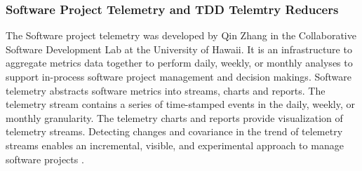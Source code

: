 \subsubsection{Software Project Telemetry and TDD Telemtry Reducers}
The Software project telemetry \cite{csdl2-04-11,csdl2-06-05} was 
developed by Qin Zhang in the Collaborative Software Development 
Lab at the University of Hawaii. It is an infrastructure to aggregate 
metrics data together to perform daily, weekly, or monthly analyses 
to support in-process software project management and decision makings. 
Software telemetry abstracts software metrics into streams, charts and 
reports. The telemetry stream contains a series of time-stamped events 
in the daily, weekly, or monthly granularity. The telemetry charts and 
reports provide visualization of telemetry streams. Detecting changes 
and covariance in the trend of telemetry streams enables an incremental, 
visible, and experimental approach to manage software 
projects \cite{csdl2-06-05}. 

